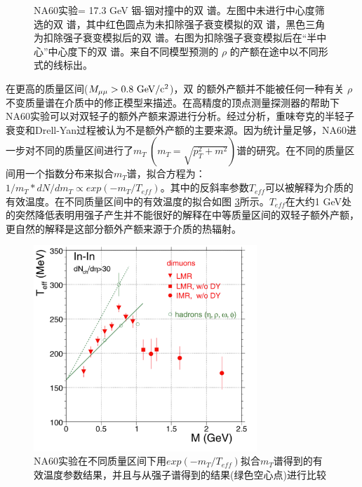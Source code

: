 \begin{figure}[htb]
\begin{subfigure}[b]{0.47\textwidth}
        \caption{}
        \label{fig:NA60SemiCentral}
    \end{subfigure}
    \caption[NA60实验\sNN = 17.3 GeV 铟-铟对撞中的双 \muon 谱]{NA60实验\sNN = 17.3 GeV 铟-铟对撞中的双 \muon 谱。左图中未进行中心度筛选的双 \muon 谱，其中红色圆点为未扣除强子衰变模拟的双 \muon 谱，黑色三角为扣除强子衰变模拟后的双 \muon 谱。右图为扣除强子衰变模拟后在“半中心”中心度下的双 \muon 谱。来自不同模型预测的 $\rho$ 的产额在途中以不同形式的线标出。}
       \label{fig:NA60DiMuon}
\end{figure}

在更高的质量区间($M_{\mu\mu} > 0.8~{\rm GeV/c^2}$)，双 \muon 的额外产额并不能被任何一种有关 $\rho$ 不变质量谱在介质中的修正模型来描述。在高精度的顶点测量探测器的帮助下NA60实验可以对双轻子的额外产额来源进行分析。经过分析，重味夸克的半轻子衰变和Drell-Yan过程被认为不是额外产额的主要来源。因为统计量足够，NA60进一步对不同的质量区间进行了$m_{T}~(m_{T} = \sqrt{p_T^2 + m^2})$谱的研究。在不同的质量区间用一个指数分布来拟合$m_T$谱，拟合方程为：$1/m_{T}*dN/dm_{T} \propto exp(-m_{T}/T_{eff})$。其中的反斜率参数$T_{eff}$可以被解释为介质的有效温度。在不同质量区间中的有效温度的拟合如图 \ref{fig:NA60T}所示。$T_{eff}$在大约1 GeV处的突然降低表明用强子产生并不能很好的解释在中等质量区间的双轻子额外产额，更自然的解释是这部分额外产额来源于介质的热辐射。

\begin{figure}[htb]
    \begin{center}
    \includegraphics[width=0.75\textwidth,clip]{figures/Chapter1/NA60T.png}
    \end{center}
    \caption[NA60不同质量区间的有效温度测量结果]{NA60实验在不同质量区间下用$exp(-m_{T}/T_{eff})$拟合$m_T$谱得到的有效温度参数结果，并且与从强子谱得到的结果(绿色空心点)进行比较}
    \label{fig:NA60T}
\end{figure}

